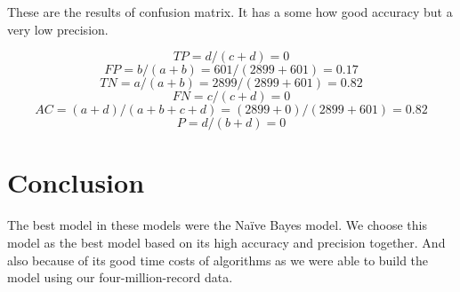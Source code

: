 \documentclass[11pt,a4paper]{article}
\begin{document}
These are the results of confusion matrix. It has a some how
good accuracy but a very low precision.

$$TP = d / (c+d) =  0$$
$$FP = b / (a+b) = 601 / (2899+601) = 0.17$$
$$TN = a / (a+b) = 2899 / (2899+601)=0.82 $$
$$FN = c / (c+d) = 0$$
$$AC=(a+d)/(a+b+c+d) = (2899+0)/(2899+601)=0.82$$
$$P = d / (b+d) = 0$$

\section{Conclusion}
\label{sec-9}
The best model in these models were the Naïve Bayes model.
We choose this model as the best model based on its high accuracy and 
precision together. And also because of its good time costs of algorithms 
as we were able to build the model using our four-million-record data.
\end{document}
